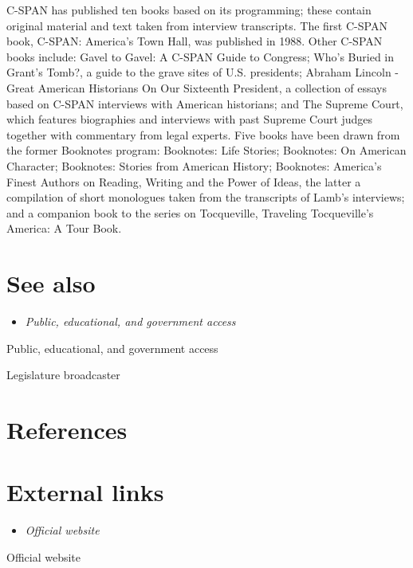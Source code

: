 C-SPAN has published ten books based on its programming; these contain
original material and text taken from interview transcripts. The first
C-SPAN book, C-SPAN: America's Town Hall, was published in 1988. Other
C-SPAN books include: Gavel to Gavel: A C-SPAN Guide to Congress; Who's
Buried in Grant's Tomb?, a guide to the grave sites of U.S. presidents;
Abraham Lincoln - Great American Historians On Our Sixteenth President,
a collection of essays based on C-SPAN interviews with American
historians; and The Supreme Court, which features biographies and
interviews with past Supreme Court judges together with commentary from
legal experts. Five books have been drawn from the former Booknotes
program: Booknotes: Life Stories; Booknotes: On American Character;
Booknotes: Stories from American History; Booknotes: America's Finest
Authors on Reading, Writing and the Power of Ideas, the latter a
compilation of short monologues taken from the transcripts of Lamb's
interviews; and a companion book to the series on Tocqueville, Traveling
Tocqueville's America: A Tour Book.

\section{See also}\label{see-also}

\begin{itemize}
\item
  \emph{Public, educational, and government access}
\end{itemize}

Public, educational, and government access

Legislature broadcaster

\section{References}\label{references}

\section{External links}\label{external-links}

\begin{itemize}
\item
  \emph{Official website}
\end{itemize}

Official website
